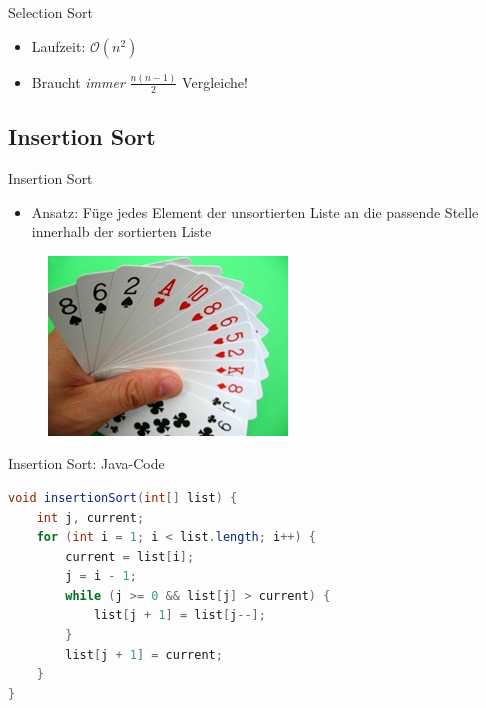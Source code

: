 \documentclass[18pt]{beamer}
\begin{document}
\begin{frame}{Selection Sort}
    \begin{itemize}
        \item Laufzeit: $\mathcal{O}(n^2)$
        \item Braucht \textit{immer} $\frac{n(n-1)}{2}$ Vergleiche!
    \end{itemize}
\end{frame}

\subsection{Insertion Sort}

\begin{frame}{Insertion Sort}
    \begin{itemize}
        \item Ansatz: Füge jedes Element der unsortierten Liste an die passende Stelle innerhalb der sortierten Liste
    \end{itemize}
    \vspace{.1in}
    \begin{figure}
        \includegraphics[scale=0.8]{img/InsertionSort.jpg}
    \end{figure}
\end{frame}

\begin{frame}[fragile]{Insertion Sort: Java-Code}
    \begin{exampleblock}{}
        \begin{lstlisting}[language=Java,basicstyle=\scriptsize]
void insertionSort(int[] list) {
    int j, current;
    for (int i = 1; i < list.length; i++) {
        current = list[i];
        j = i - 1;
        while (j >= 0 && list[j] > current) {
            list[j + 1] = list[j--];
        }
        list[j + 1] = current;
    }
}
        \end{lstlisting}
    \end{exampleblock}
\end{frame}
\end{document}

